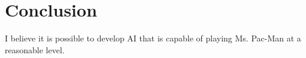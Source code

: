 
\section{Conclusion}
I believe it is possible to develop AI that is capable of playing Ms. Pac-Man at a reasonable level.